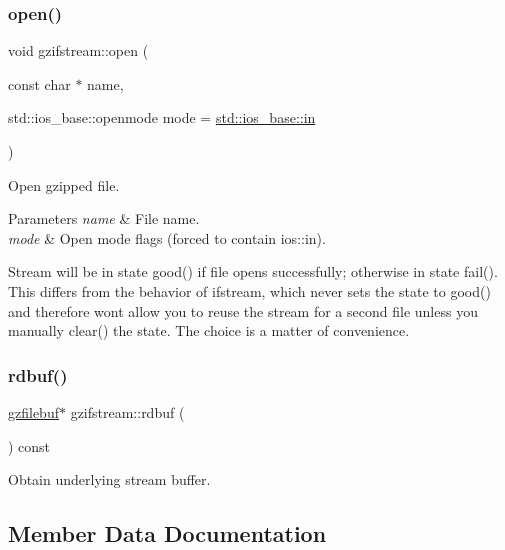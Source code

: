\subsubsection{\texorpdfstring{open()}{open()}}
{\footnotesize\ttfamily void gzifstream\+::open (\begin{DoxyParamCaption}\item[{const char $\ast$}]{name,  }\item[{std\+::ios\+\_\+base\+::openmode}]{mode = {\ttfamily \mbox{\hyperlink{gun_8c_a8bab68b4d22f69428207fabb60dc4f5c}{std\+::ios\+\_\+base\+::in}}} }\end{DoxyParamCaption})}



Open gzipped file. 


\begin{DoxyParams}{Parameters}
{\em name} & File name. \\
\hline
{\em mode} & Open mode flags (forced to contain ios\+::in).\\
\hline
\end{DoxyParams}
Stream will be in state good() if file opens successfully; otherwise in state fail(). This differs from the behavior of ifstream, which never sets the state to good() and therefore won\textquotesingle{}t allow you to reuse the stream for a second file unless you manually clear() the state. The choice is a matter of convenience. \mbox{\label{classgzifstream_a1c5a0ab4f99f8d8e3406af7bfd82b133}} 
\subsubsection{\texorpdfstring{rdbuf()}{rdbuf()}}
{\footnotesize\ttfamily \mbox{\hyperlink{classgzfilebuf}{gzfilebuf}}$\ast$ gzifstream\+::rdbuf (\begin{DoxyParamCaption}{ }\end{DoxyParamCaption}) const\hspace{0.3cm}{\ttfamily [inline]}}

Obtain underlying stream buffer. 

\subsection{Member Data Documentation}
\mbox{\label{classgzifstream_a5bc9c8a3a1b4b40b43161c372ba852e2}} 
